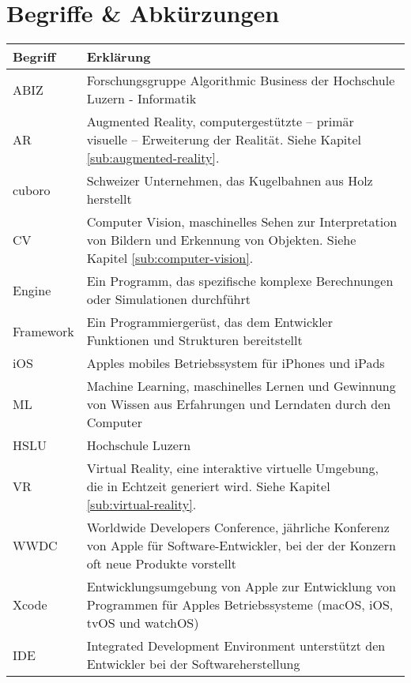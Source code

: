 \section*{Begriffe \& Abkürzungen}
\begin{table}
	\begin{tabular}{@{} p{} p{} @{}}
		\hline
		\textbf{Begriff} & \textbf{Erklärung} \\
		\hline
		ABIZ	& Forschungsgruppe Algorithmic Business der Hochschule Luzern - Informatik \\
		AR 		& Augmented Reality, computergestützte – primär visuelle – Erweiterung der Realität. Siehe Kapitel \ref{sub:augmented-reality}. \\
		cuboro	& Schweizer Unternehmen, das Kugelbahnen aus Holz herstellt \\
		CV		& Computer Vision, maschinelles Sehen zur Interpretation von Bildern und Erkennung von Objekten. Siehe Kapitel \ref{sub:computer-vision}. \\
		Engine	& Ein Programm, das spezifische komplexe Berechnungen oder Simulationen durchführt \\
		Framework	& Ein Programmiergerüst, das dem Entwickler Funktionen und Strukturen bereitstellt \\
		iOS		& Apples mobiles Betriebssystem für iPhones und iPads \\
		ML		& Machine Learning, maschinelles Lernen und Gewinnung von Wissen aus Erfahrungen und Lerndaten durch den Computer \\
		HSLU	& Hochschule Luzern \\
		VR		& Virtual Reality, eine interaktive virtuelle Umgebung, die in Echtzeit generiert wird. Siehe Kapitel \ref{sub:virtual-reality}. \\
		WWDC	& Worldwide Developers Conference, jährliche Konferenz von Apple für Software-Entwickler, bei der der Konzern oft neue Produkte vorstellt \\
		Xcode	& Entwicklungsumgebung von Apple zur Entwicklung von Programmen für Apples Betriebssysteme (macOS, iOS, tvOS und watchOS) \\
		IDE 	& Integrated Development Environment unterstützt den Entwickler bei der Softwareherstellung \\
		\hline
	\end{tabular}
\end{table}

